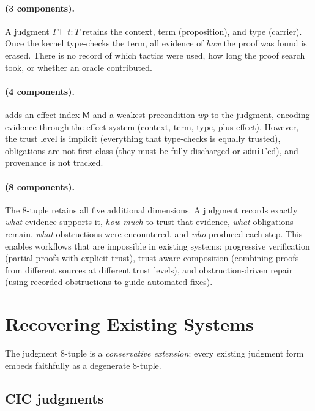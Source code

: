 \documentclass[11pt]{article}
\begin{document}
\paragraph{\LEAN{} (3 components).}
A \LEAN{} judgment $\Gamma \vdash t : T$ retains the context, term (proposition),
and type (carrier).  Once the kernel type-checks the term, all evidence of
\emph{how} the proof was found is erased.  There is no record of which
tactics were used, how long the proof search took, or whether an oracle
contributed.

\paragraph{\Fstar{} (4 components).}
\Fstar{} adds an effect index $\mathsf{M}$ and a weakest-precondition
$\mathit{wp}$ to the judgment, encoding evidence through the
effect system (context, term, type, plus effect).  However, the trust level is implicit (everything that
type-checks is equally trusted), obligations are not first-class (they
must be fully discharged or \texttt{admit}'ed), and provenance is not
tracked.

\paragraph{\JuGeo{} (8 components).}
The 8-tuple retains all five additional dimensions.  A judgment records
exactly \emph{what} evidence supports it, \emph{how much} to trust that
evidence, \emph{what} obligations remain, \emph{what} obstructions were
encountered, and \emph{who} produced each step.  This enables workflows
that are impossible in existing systems: progressive verification (partial
proofs with explicit trust), trust-aware composition (combining proofs from
different sources at different trust levels), and obstruction-driven repair
(using recorded obstructions to guide automated fixes).


\section{Recovering Existing Systems}\label{sec:recovering}

The judgment 8-tuple is a \emph{conservative extension}: every existing
judgment form embeds faithfully as a degenerate 8-tuple.

\subsection{CIC judgments}
\end{document}
